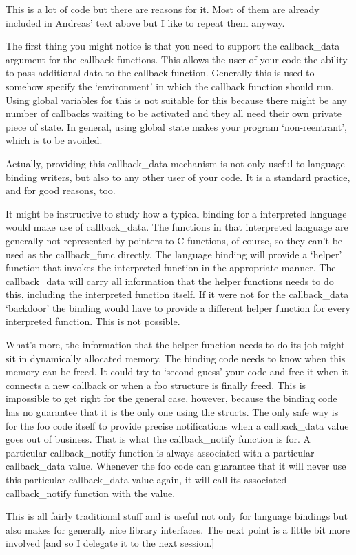 \documentclass{article}
\begin{document}
This is a lot of code but there are reasons for it.  Most of them are
already included in Andreas' text above but I like to repeat them
anyway.

The first thing you might notice is that you need to support the
callback\_data argument for the callback functions.  This allows the
user of your code the ability to pass additional data to the callback
function.  Generally this is used to somehow specify the `environment'
in which the callback function should run.  Using global variables for
this is not suitable for this because there might be any number of
callbacks waiting to be activated and they all need their own private
piece of state.  In general, using global state makes your program
`non-reentrant', which is to be avoided.

Actually, providing this callback\_data mechanism is not only useful to
language binding writers, but also to any other user of your code.  It
is a standard practice, and for good reasons, too.

It might be instructive to study how a typical binding for a
interpreted language would make use of callback\_data.  The functions
in that interpreted language are generally not represented by pointers
to C functions, of course, so they can't be used as the callback\_func
directly.  The language binding will provide a `helper' function that
invokes the interpreted function in the appropriate manner.  The
callback\_data will carry all information that the helper functions
needs to do this, including the interpreted function itself.  If it
were not for the callback\_data `backdoor' the binding would have to
provide a different helper function for every interpreted function.
This is not possible.

What's more, the information that the helper function needs to do its
job might sit in dynamically allocated memory.  The binding code needs
to know when this memory can be freed.  It could try to `second-guess'
your code and free it when it connects a new callback or when a foo
structure is finally freed.  This is impossible to get right for the
general case, however, because the binding code has no guarantee that
it is the only one using the structs.  The only safe way is for the
foo code itself to provide precise notifications when a callback\_data
value goes out of business.  That is what the callback\_notify
function is for.  A particular callback\_notify function is always
associated with a particular callback\_data value.  Whenever the foo
code can guarantee that it will never use this particular
callback\_data value again, it will call its associated
callback\_notify function with the value.

This is all fairly traditional stuff and is useful not only for
language bindings but also makes for generally nice library
interfaces.  The next point is a little bit more involved [and so I
delegate it to the next session.]
\end{document}
